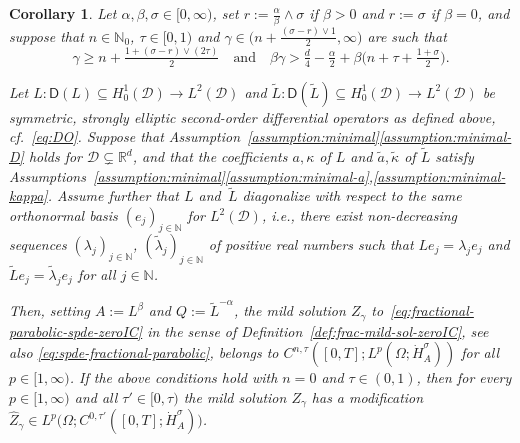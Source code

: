 \documentclass[reqno]{amsart}
\numberwithin{equation}{section}
\newcommand{\bbN}{\mathbb{N}}
\newcommand{\R}{\mathbb{R}}
\newcommand{\N}{\mathbb{N}}
\newcommand{\cD}{\mathcal{D}}
\newcommand{\from}{\colon}
\newcommand{\Hdot}[1]{\dot{H}^{#1}_A}
\newtheorem{corollary}[lemma]{Corollary}
\theoremstyle{remark}
\theoremstyle{definition}
\begin{document}
\begin{corollary}\label{cor:example-1a-zeroIC} 
	Let $\alpha,\beta,\sigma\in[0,\infty)$, 
	set 
	$r:=\frac{\alpha}{\beta} \wedge \sigma$ if $\beta > 0$ 
	and $r:=\sigma$ if $\beta=0$, 
	and suppose that
	$n \in \N_0$, $\tau \in [0,1)$  
	and 
	$\gamma \in\bigl( n + \frac{(\sigma-r)\vee 1}{2}, \infty\bigr)$ 
	are
	such that
	\begin{equation}\label{eq:conditions-exponents-example1a}
	\gamma 
	\geq 
	n + \tfrac{1+(\sigma-r)\vee(2\tau)}{2} 
	\quad 
	\text{and} 
	\quad 
	\beta\gamma 
	> 
	\tfrac{d}{4} - \tfrac{\alpha}{2} + \beta\bigl( n+\tau+\tfrac{1 + \sigma}{2} \bigr)
	.
	\end{equation}
	
	Let $L\from\mathsf{D}(L) \subseteq H^1_0(\cD) \to L^2(\cD)$ and 
	${\widetilde{L}\from\mathsf{D}(\widetilde{L}) \subseteq H^1_0(\cD) \to L^2(\cD)}$ 
	be symmetric, strongly elliptic second-order differential
	operators  
	as defined above, cf.~\eqref{eq:DO}. 
	Suppose that 
	Assumption~\textup{\ref{assumption:minimal}\ref{assumption:minimal-D}}  
	holds for $\cD\subsetneq\R^d$\!,  
	and that 
	the coefficients 
	$a,\kappa$ of $L$ and $\widetilde a, \widetilde \kappa$ of $\widetilde L$
	satisfy  Assumptions~\textup{\ref{assumption:minimal}\ref{assumption:minimal-a},\ref{assumption:minimal-kappa}}. 
	Assume further  
	that 
	$L$ and~$\widetilde L$ 
	diagonalize 
	with respect to the same orthonormal basis $(e_j)_{j\in\bbN}$ 
	for $L^2(\cD)$, i.e., 
	there exist non-decreasing sequences 
	$(\lambda_j)_{j\in\N}$, $(\widetilde{\lambda}_j)_{j\in\N}$ of
	positive real numbers
	such that ${Le_j = \lambda_j e_j}$ 
	and $\widetilde L e_j = \widetilde{\lambda}_j e_j$
	for all $j \in \N$. 
	
	Then, setting $A := L^\beta$ and $Q := \widetilde L^{-\alpha}$\!, 
	the mild solution $Z_\gamma$ 
	to~\eqref{eq:fractional-parabolic-spde-zeroIC} in the sense of 
	Definition~\textup{\ref{def:frac-mild-sol-zeroIC}}, 
	see also \eqref{eq:spde-fractional-parabolic}, 
	belongs to 
	$C^{n,\tau}([0, T]; L^p(\Omega;\Hdot \sigma))$ 
	for all~${p \in [1,\infty)}$. 
	If the above conditions hold with $n = 0$ and 
	$\tau\in(0,1)$, 
	then for every $p\in[1,\infty)$ 
	and all $\tau'\in[0,\tau)$ the mild solution 
	$Z_\gamma$ has a modification 
	$\widehat Z_\gamma \in
	L^p\bigl(\Omega; C^{0,\tau'}([0,T];\dot H^\sigma_A)\bigr)$.
\end{corollary}
\end{document}
